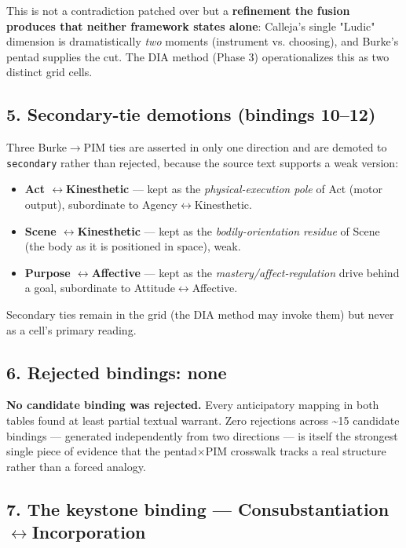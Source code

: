 \documentclass[11pt]{report}
\begin{document}
This is not a contradiction patched over but a \textbf{refinement the fusion produces that neither framework states alone}: Calleja's single "Ludic" dimension is dramatistically \textit{two} moments (instrument vs. choosing), and Burke's pentad supplies the cut. The DIA method (Phase 3) operationalizes this as two distinct grid cells.


\subsection{5. Secondary-tie demotions (bindings 10–12)}


Three Burke$\rightarrow$\allowbreak PIM ties are asserted in only one direction and are demoted to \texttt{secondary} rather than rejected, because the source text supports a weak version:

\begin{itemize}
\item \textbf{Act $\leftrightarrow$\allowbreak  Kinesthetic} — kept as the \textit{physical-execution pole} of Act (motor output), subordinate to Agency$\leftrightarrow$\allowbreak Kinesthetic.
\item \textbf{Scene $\leftrightarrow$\allowbreak  Kinesthetic} — kept as the \textit{bodily-orientation residue} of Scene (the body as it is positioned in space), weak.
\item \textbf{Purpose $\leftrightarrow$\allowbreak  Affective} — kept as the \textit{mastery/affect-regulation} drive behind a goal, subordinate to Attitude$\leftrightarrow$\allowbreak Affective.
\end{itemize}


Secondary ties remain in the grid (the DIA method may invoke them) but never as a cell's primary reading.


\subsection{6. Rejected bindings: none}


\textbf{No candidate binding was rejected.} Every anticipatory mapping in both tables found at least partial textual warrant. Zero rejections across \textasciitilde{}15 candidate bindings — generated independently from two directions — is itself the strongest single piece of evidence that the pentad$\times$\allowbreak PIM crosswalk tracks a real structure rather than a forced analogy.


\subsection{7. The keystone binding — Consubstantiation $\leftrightarrow$\allowbreak  Incorporation}
\end{document}
